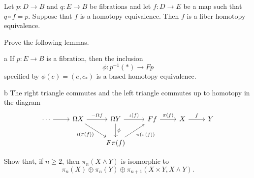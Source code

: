 %
%

\begin{problem}{7.1}
  Let $p : D \to B$ and $q : E \to B$ be fibrations and let $f : D \to E$ be a map such that $q\circ f = p$. Suppose that $f$ is a homotopy equivalence. Then $f$ is a fiber homotopy equivalence.
\end{problem}

\begin{problem}{8.1}
  Prove the following lemmas.
\end{problem}

\begin{parts}
  \begin{part}{a}
    If $p : E \to B$ is a fibration, then the inclusion
    \[ \phi : p^{-1}(*) \to Fp\]
    specified by $\phi(e) = (e, c_*)$ is a based homotopy equivalence.
  \end{part}

  \begin{part}{b}
    The right triangle commutes and the left triangle commutes up to homotopy in the diagram
  \[\begin{tikzcd}
	  \cdots & {\Omega X} & {\Omega Y} & Ff & X & Y \\
	  && {F\pi(f)}
	  \arrow[from=1-1, to=1-2]
	  \arrow["{-\Omega f}", from=1-2, to=1-3]
	  \arrow["f", from=1-5, to=1-6]
	  \arrow["{\pi(f)}", from=1-4, to=1-5]
	  \arrow["{\iota(f)}", from=1-3, to=1-4]
	  \arrow["{\iota(\pi(f))}"', from=1-2, to=2-3]
	  \arrow["\phi", from=1-3, to=2-3]
	  \arrow["{\pi(\pi(f))}"', from=2-3, to=1-4]
  \end{tikzcd}\]
  \end{part}
\end{parts}

\begin{problem}{9.1}
  Show that, if $n\geq 2$, then $\pi_n(X\wedge Y)$ is isomorphic to
  \[
    \pi_n(X) \oplus \pi_n(Y) \oplus \pi_{n+1}(X\times Y, X\wedge Y).
  \]
\end{problem}
